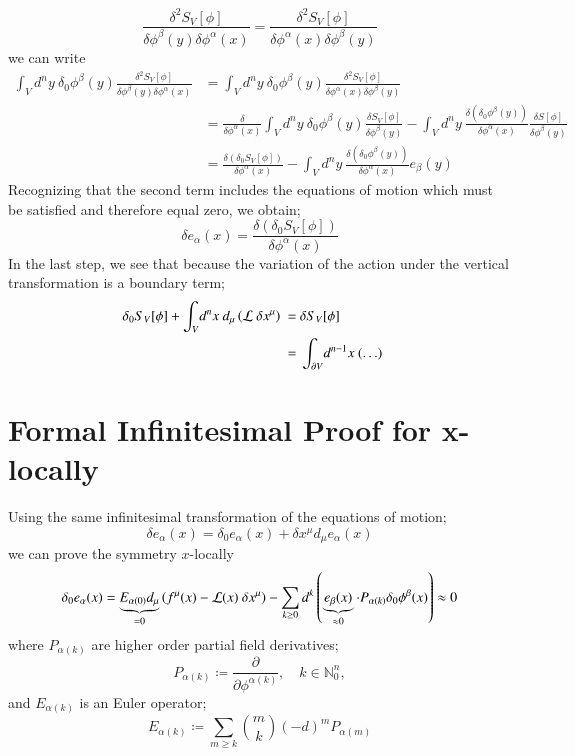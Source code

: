 \documentclass{article}
\begin{document}
\[
	\frac{\delta^2 S_V[\phi]}{\delta \phi^{\beta}(y)\delta \phi^{\alpha}(x)} = \frac{\delta^2 S_V[\phi]}{\delta \phi^{\alpha}(x)\delta \phi^{\beta}(y)}
\]
we can write
\begin{align*}
	\int_V\! d^ny~ \delta_0\phi^{\beta}(y)\frac{\delta^2 S_V[\phi]}{\delta \phi^{\beta}(y)\delta \phi^{\alpha}(x)} &= \int_V\! d^ny~ \delta_0\phi^{\beta}(y)\frac{\delta^2 S_V[\phi]}{\delta \phi^{\alpha}(x)\delta \phi^{\beta}(y)} \\
														        &= \frac{\delta}{\delta \phi^{\alpha}(x)} \int_V\! d^ny~ \delta_0\phi^{\beta}(y)\frac{\delta S_V[\phi]}{\delta \phi^{\beta}(y)} -\int_V\! d^ny~ \frac{\delta(\delta_0\phi^{\beta}(y))}{\delta \phi^{\alpha}(x)} \frac{\delta S[\phi]}{\delta \phi^{\beta}(y)} \\
	&= \frac{\delta(\delta_0 S_V[\phi]) }{\delta \phi^{\alpha}(x)} -\int_V\! d^ny~ \frac{\delta(\delta_0\phi^{\beta}(y))}{\delta \phi^{\alpha}(x)} e_{\beta}(y)
\end{align*}
Recognizing that the second term includes the equations of motion which must be satisfied and therefore equal zero, we obtain;
\[
	\delta e_\alpha(x) = \frac{\delta(\delta_0 S_V[\phi]) }{\delta \phi^{\alpha}(x)}
\]
In the last step, we see that because the variation of the action under the vertical transformation is a boundary term;
\begin{align*}  \delta_0 S_V[\phi]+\int_V\! d^nx~d_{\mu} \left({\cal L}~\delta x^{\mu} \right)  ~=~&\delta S_V[\phi]\cr
~=~&\int_{\partial V} \!d^{n-1}x~(\ldots)\end{align*}

\section{Formal Infinitesimal Proof for x-locally}
Using the same infinitesimal transformation of the equations of motion;
\[
	\delta e_\alpha(x) = \delta_0 e_\alpha(x) + \delta x^\mu d_\mu e_\alpha(x)
\]
we can prove the symmetry $x$-locally
\[
\delta_0 e_{\alpha}(x) = \underbrace{E_{\alpha(0)} d_{\mu}}_{=0}\left(f^{\mu}(x)-{\cal L}(x)~\delta x^{\mu}\right) - \sum_{k\geq 0} d^k\left( \underbrace{e_{\beta}(x)}_{\approx 0} \cdot P_{\alpha(k)}\delta_0\phi^{\beta}(x) \right) \approx 0
\]
where $P_{\alpha(k)}$ are higher order partial field derivatives;
\[
P_{\alpha(k)} \coloneqq \frac{\partial}{\partial \phi^{\alpha(k)}}, \quad k \in \mathbb{N}_0^n,
\]
and $E_{\alpha(k)}$ is an Euler operator;
\[
	E_{\alpha(k)} \coloneqq \sum_{m \ge k}\binom{m}{k} (-d)^m P_{\alpha(m)}
\]
\end{document}
